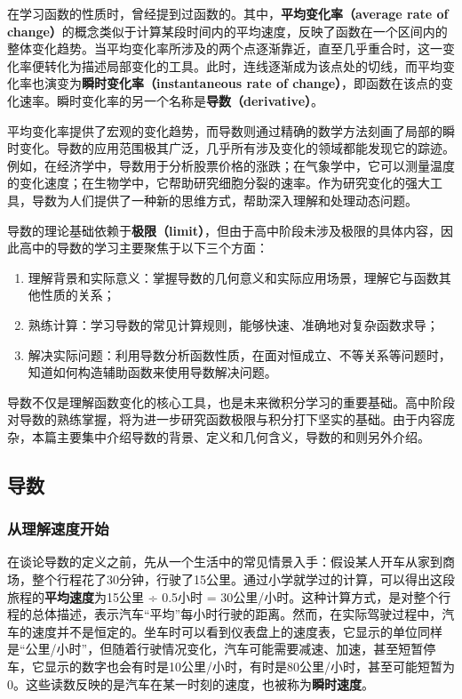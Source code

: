 
\begin{issues}
\issueDraft
\end{issues}

在学习函数的性质时，曾经提到过函数的。其中，\textbf{平均变化率（average rate of change）}的概念类似于计算某段时间内的平均速度，反映了函数在一个区间内的整体变化趋势。当平均变化率所涉及的两个点逐渐靠近，直至几乎重合时，这一变化率便转化为描述局部变化的工具。此时，连线逐渐成为该点处的切线，而平均变化率也演变为\textbf{瞬时变化率（instantaneous rate of change）}，即函数在该点的变化速率。瞬时变化率的另一个名称是\textbf{导数（derivative）}。

平均变化率提供了宏观的变化趋势，而导数则通过精确的数学方法刻画了局部的瞬时变化。导数的应用范围极其广泛，几乎所有涉及变化的领域都能发现它的踪迹。例如，在经济学中，导数用于分析股票价格的涨跌；在气象学中，它可以测量温度的变化速度；在生物学中，它帮助研究细胞分裂的速率。作为研究变化的强大工具，导数为人们提供了一种新的思维方式，帮助深入理解和处理动态问题。

导数的理论基础依赖于\textbf{极限（limit）}，但由于高中阶段未涉及极限的具体内容，因此高中的导数的学习主要聚焦于以下三个方面：
\begin{enumerate}
\item 理解背景和实际意义：掌握导数的几何意义和实际应用场景，理解它与函数其他性质的关系；
\item 熟练计算：学习导数的常见计算规则，能够快速、准确地对复杂函数求导；
\item 解决实际问题：利用导数分析函数性质，在面对恒成立、不等关系等问题时，知道如何构造辅助函数来使用导数解决问题。
\end{enumerate}

导数不仅是理解函数变化的核心工具，也是未来微积分学习的重要基础。高中阶段对导数的熟练掌握，将为进一步研究函数极限与积分打下坚实的基础。由于内容庞杂，本篇主要集中介绍导数的背景、定义和几何含义，导数的和则另外介绍。

\subsection{导数}

\subsubsection{从理解速度开始}

在谈论导数的定义之前，先从一个生活中的常见情景入手：假设某人开车从家到商场，整个行程花了30分钟，行驶了15公里。通过小学就学过的计算，可以得出这段旅程的\textbf{平均速度}为15公里 ÷ 0.5小时 = 30公里/小时。这种计算方式，是对整个行程的总体描述，表示汽车“平均”每小时行驶的距离。然而，在实际驾驶过程中，汽车的速度并不是恒定的。坐车时可以看到仪表盘上的速度表，它显示的单位同样是“公里/小时”，但随着行驶情况变化，汽车可能需要减速、加速，甚至短暂停车，它显示的数字也会有时是10公里/小时，有时是80公里/小时，甚至可能短暂为0。这些读数反映的是汽车在某一时刻的速度，也被称为\textbf{瞬时速度}。

